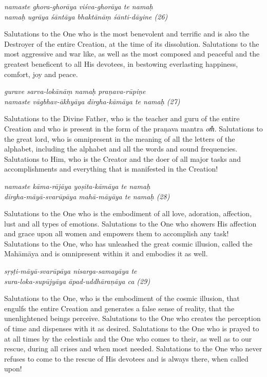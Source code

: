 \documentclass[12pt,oneside,a4paper]{article}
\newenvironment{shloka}[1]
  {\bigskip\center#1\varwidth{\linewidth}}
  {\endvarwidth\endcenter\bigskip}
\newcommand{\tl}[1]{\emph{#1}}
\begin{document}
\begin{shloka}\itshape
  namaste ghora-ghorāya viśva-ghorāya te namaḥ\\
  namaḥ ugrāya śāntāya bhaktānāṃ śānti-dāyine (26)
\end{shloka}

Salutations to the One who is the most benevolent and terrific and is also
the Destroyer of the entire Creation, at the time of its dissolution.
Salutations to the most aggressive and war like, as well as the most composed
and peaceful and the greatest beneficent to all His devotees, in bestowing
everlasting happiness, comfort, joy and peace.

\begin{shloka}\itshape
  gurave sarva-lokānāṃ namaḥ praṇava-rūpiṇe\\
  namaste vāgbhav-ākhyāya dīrgha-kāmāya te namaḥ (27)
\end{shloka}

Salutations to the Divine Father, who is the teacher and guru of the entire
Creation and who is present in the form of the praṇava mantra \tl{om̐}.
Salutations to the great lord, who is omnipresent in the meaning of all
the letters of the alphabet, including the alphabet and all the words and sound
frequencies. Salutations to Him, who is the Creator and the doer of all major
tasks and accomplishments and everything that is manifested in the Creation!

\begin{shloka}\itshape
  namaste kāma-rājāya yoṣita-kāmāya te namaḥ\\
  dīrgha-māyā-svarūpāya mahā-māyāya te namaḥ (28)
\end{shloka}

Salutations to the One who is the embodiment of all love, adoration, affection,
lust and all types of emotions. Salutations to the One who showers His affection
and grace upon all women and empowers them to accomplish any task! Salutations
to the One, who has unleashed the great cosmic illusion, called the Mahāmāya
and is omnipresent within it and embodies it as well.

\begin{shloka}\itshape
  sṛṣṭi-māyā-svarūpāya nisarga-samayāya te\\
  sura-loka-supūjyāya āpad-uddhāraṇāya ca (29)
\end{shloka}

Salutations to the One, who is the embodiment of the cosmic illusion, that
engulfs the entire Creation and generates a false sense of reality, that
the unenlightened beings perceive. Salutations to the One who creates
the perception of time and dispenses with it as desired. Salutations to the One
who is prayed to at all times by the celestials and the One who comes to their,
as well as to our rescue, during all crises and when most needed. Salutations
to the One who never refuses to come to the rescue of His devotees and is always
there, when called upon!
\end{document}
